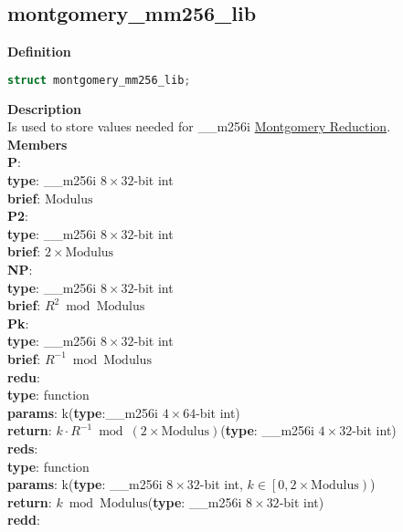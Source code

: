 \documentclass[8pt, a4paper, oneside, twocolumn]{article}
\begin{document}
\subsection{montgomery\_mm256\_lib}
\noindent \large \textbf{Definition} \normalsize
\begin{lstlisting}[language=c++]
struct montgomery_mm256_lib;
\end{lstlisting}
\noindent \large \textbf{Description} \normalsize \\
Is used to store values needed for \_\_m256i \href{https://en.wikipedia.org/wiki/Montgomery_modular_multiplication}{Montgomery Reduction}.\\
\noindent \large \textbf{Members} \normalsize \\
\textbf{P}:\\
\indent\textbf{type}: \_\_m256i $8\times 32$-bit int\\
\indent\textbf{brief}: $\mathrm{Modulus}$\\
\textbf{P2}:\\
\indent\textbf{type}: \_\_m256i $8\times 32$-bit int\\
\indent\textbf{brief}: $2\times \mathrm{Modulus}$\\
\textbf{NP}:\\
\indent\textbf{type}: \_\_m256i $8\times 32$-bit int\\
\indent\textbf{brief}: $R^2\bmod\mathrm{Modulus}$\\
\textbf{Pk}:\\
\indent\textbf{type}: \_\_m256i $8\times 32$-bit int\\
\indent\textbf{brief}: $R^{-1}\bmod\mathrm{Modulus}$\\
\textbf{redu}:\\
\indent\textbf{type}: function\\
\indent\textbf{params}: k(\textbf{type}:\_\_m256i $4\times 64$-bit int)\\
\indent\textbf{return}: $k\cdot R^{-1}\bmod \left(2\times\mathrm{Modulus}\right)$(\textbf{type}: \_\_m256i $4\times 32$-bit int)\\
\textbf{reds}:\\
\indent\textbf{type}: function\\
\indent\textbf{params}: k(\textbf{type}: \_\_m256i $8\times 32$-bit int, $k\in \left[0,2\times \mathrm{Modulus}\right)$)\\
\indent\textbf{return}: $k\bmod \mathrm{Modulus}$(\textbf{type}: \_\_m256i $8\times 32$-bit int)\\
\textbf{redd}:\\
\end{document}
